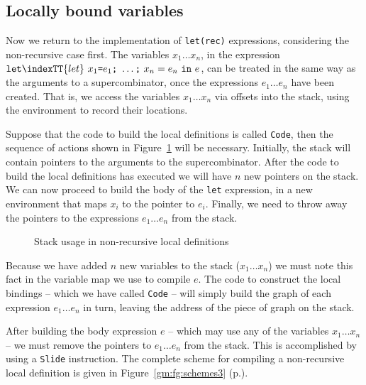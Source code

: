 \subsection{Locally bound variables}

Now we return to the implementation of \mbox{\tt let(rec)} expressions,
considering the non-recursive case first. The variables $x_1
\ldots x_n$, in the expression
$\mbox{\tt let}\indexTT{let}~x_1\mbox{\tt =}e_1\mbox{\tt ;}~\ldots\mbox{\tt ;}~x_n=e_n~\mbox{\tt in}~e$, can be treated in the
same way as the arguments to a supercombinator, once the expressions
$e_1\ldots e_n$ have been created. That is, we access the variables
$x_1 \ldots x_n$ via offsets into the stack, using the environment to
record their locations.

Suppose that the code to build the local definitions is called \mbox{\tt Code},
then the sequence of actions shown in Figure~\ref{gm:fig:let} will be
necessary. Initially, the stack will contain pointers to the arguments
to the supercombinator. After the code to build the local definitions
has executed we will have $n$ new pointers on the stack. We can now
proceed to build the body of the \mbox{\tt let} expression, in a new
environment that maps $x_i$ to the pointer to $e_i$. Finally, we need
to throw away the pointers to the expressions $e_1\ldots e_n$ from the
stack.
\begin{figure} %

\caption{Stack usage in non-recursive local definitions}
\label{gm:fig:let}
\end{figure}

Because we have added $n$ new variables to the stack ($x_1 \ldots
x_n$) we must note this fact in the variable map we use to compile
$e$. The code to construct the local bindings -- which we have called
\mbox{\tt Code} -- will simply build the graph of each expression $e_1 \ldots
e_n$ in turn, leaving the address of the piece of graph on the stack.

After building the body expression $e$ -- which may use any of the
variables $x_1 \ldots x_n$ -- we must remove the pointers to $e_1
\ldots e_n$ from the stack. This is accomplished by using a \mbox{\tt Slide}
instruction. The complete scheme for compiling a non-recursive local
definition is given in Figure~\ref{gm:fg:schemes3}
(p.\pageref{gm:fg:schemes3}).

